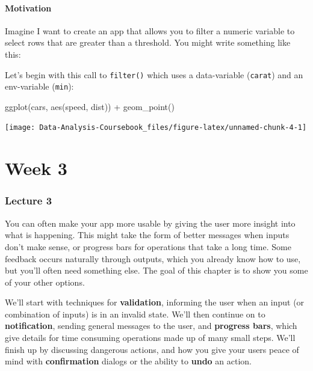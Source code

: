 \documentclass[
]{article}
\newenvironment{Shaded}{\begin{snugshade}}{\end{snugshade}}
\newcommand{\FunctionTok}[1]{\textcolor[rgb]{0.00,0.00,0.00}{#1}}
\newcommand{\NormalTok}[1]{#1}
\newcommand{\SpecialCharTok}[1]{\textcolor[rgb]{0.00,0.00,0.00}{#1}}
\begin{document}
\hypertarget{tidy-motivation}{%
\subsection{Motivation}\label{tidy-motivation}}

Imagine I want to create an app that allows you to filter a numeric variable to select rows that are greater than a threshold.
You might write something like this:

Let's begin with this call to \texttt{filter()} which uses a data-variable (\texttt{carat}) and an env-variable (\texttt{min}):

\begin{Shaded}
\begin{Highlighting}[]
\FunctionTok{ggplot}\NormalTok{(cars, }\FunctionTok{aes}\NormalTok{(speed, dist)) }\SpecialCharTok{+} 
  \FunctionTok{geom\_point}\NormalTok{()}
\end{Highlighting}
\end{Shaded}

\begin{center}\texttt{[image: Data-Analysis-Coursebook\_files/figure-latex/unnamed-chunk-4-1]} \end{center}

\hypertarget{part-week-3}{%
\part*{Week 3}\label{part-week-3}}

\hypertarget{lecture3}{%
\section{Lecture 3}\label{lecture3}}

You can often make your app more usable by giving the user more insight into what is happening.
This might take the form of better messages when inputs don't make sense, or progress bars for operations that take a long time.
Some feedback occurs naturally through outputs, which you already know how to use, but you'll often need something else.
The goal of this chapter is to show you some of your other options.

We'll start with techniques for \textbf{validation}, informing the user when an input (or combination of inputs) is in an invalid state.
We'll then continue on to \textbf{notification}, sending general messages to the user, and \textbf{progress bars}, which give details for time consuming operations made up of many small steps.
We'll finish up by discussing dangerous actions, and how you give your users peace of mind with \textbf{confirmation} dialogs or the ability to \textbf{undo} an action.
\end{document}
